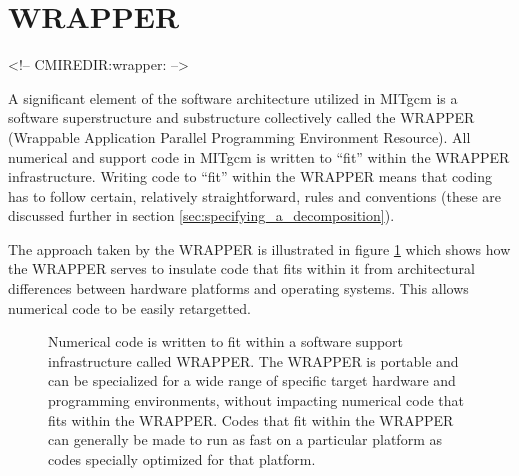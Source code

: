 \section{WRAPPER}
\begin{rawhtml}
<!-- CMIREDIR:wrapper: -->
\end{rawhtml}

A significant element of the software architecture utilized in MITgcm
is a software superstructure and substructure collectively called the
WRAPPER (Wrappable Application Parallel Programming Environment
Resource). All numerical and support code in MITgcm is written to
``fit'' within the WRAPPER infrastructure. Writing code to ``fit''
within the WRAPPER means that coding has to follow certain, relatively
straightforward, rules and conventions (these are discussed further in
section \ref{sec:specifying_a_decomposition}).

The approach taken by the WRAPPER is illustrated in figure
\ref{fig:fit_in_wrapper} which shows how the WRAPPER serves to
insulate code that fits within it from architectural differences
between hardware platforms and operating systems. This allows
numerical code to be easily retargetted.


\begin{figure}
\begin{center}
\end{center}
\caption{
Numerical code is written to fit within a software support
infrastructure called WRAPPER. The WRAPPER is portable and
can be specialized for a wide range of specific target hardware and 
programming environments, without impacting numerical code that fits
within the WRAPPER. Codes that fit within the WRAPPER can generally be
made to run as fast on a particular platform as codes specially 
optimized for that platform.}
\label{fig:fit_in_wrapper}
\end{figure}

